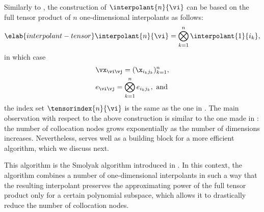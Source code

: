 Similarly to , the construction of
$\interpolant{n}{\vi}$ can be based on the full tensor product of $n$
one-dimensional interpolants as follows:
\begin{equation} \elab{interpolant-tensor}
  \interpolant{n}{\vi} = \bigotimes_{k = 1}^n \interpolant{1}{i_k},
\end{equation}
in which case
\begin{align*}
  & \vx_{\vi \vj} = (\x_{i_k j_k})_{k = 1}^n, \\
  & e_{\vi \vj} = \bigotimes_{k = 1}^n e_{i_k j_k}, \text{ and}
\end{align*}
the index set $\tensorindex{n}{\vi}$ is the same as the one in
. The main observation with respect to the above
construction is similar to the one made in : the number
of collocation nodes grows exponentially as the number of dimensions increases.
Nevertheless,  serves well as a building block for a
more efficient algorithm, which we discuss next.

This algorithm is the Smolyak algorithm introduced in .
In this context, the algorithm combines a number of one-dimensional interpolants
in such a way that the resulting interpolant preserves the approximating power
of the full tensor product only for a certain polynomial subspace, which allows
it to drastically reduce the number of collocation nodes.

